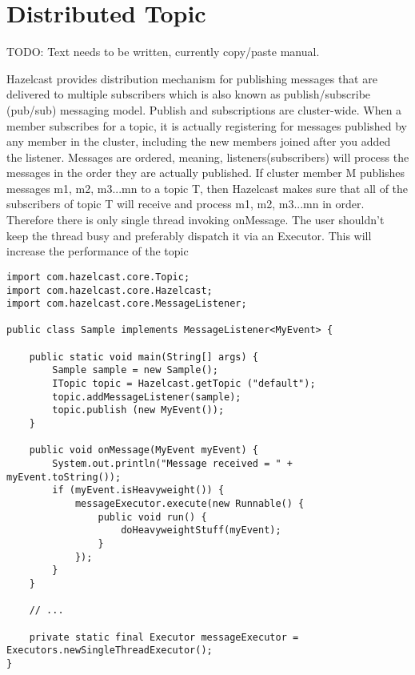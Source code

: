 \chapter{Distributed Topic}

TODO: Text needs to be written, currently copy/paste manual.

Hazelcast provides distribution mechanism for publishing messages that are delivered to multiple subscribers which is also known as publish/subscribe (pub/sub) messaging model. Publish and subscriptions are cluster-wide. When a member subscribes for a topic, it is actually registering for messages published by any member in the cluster, including the new members joined after you added the listener. Messages are ordered, meaning, listeners(subscribers) will process the messages in the order they are actually published. If cluster member M publishes messages m1, m2, m3...mn to a topic T, then Hazelcast makes sure that all of the subscribers of topic T will receive and process m1, m2, m3...mn in order. Therefore there is only single thread invoking onMessage. The user shouldn't keep the thread busy and preferably dispatch it via an Executor. This will increase the performance of the topic

\begin{verbatim}
import com.hazelcast.core.Topic;
import com.hazelcast.core.Hazelcast;
import com.hazelcast.core.MessageListener;

public class Sample implements MessageListener<MyEvent> {

    public static void main(String[] args) {
        Sample sample = new Sample();
        ITopic topic = Hazelcast.getTopic ("default");
        topic.addMessageListener(sample);
        topic.publish (new MyEvent());
    }

    public void onMessage(MyEvent myEvent) {
        System.out.println("Message received = " + myEvent.toString());
        if (myEvent.isHeavyweight()) {
            messageExecutor.execute(new Runnable() {
                public void run() {
                    doHeavyweightStuff(myEvent);
                }
            });
        }
    }

    // ...

    private static final Executor messageExecutor = Executors.newSingleThreadExecutor();
}
\end{verbatim}

